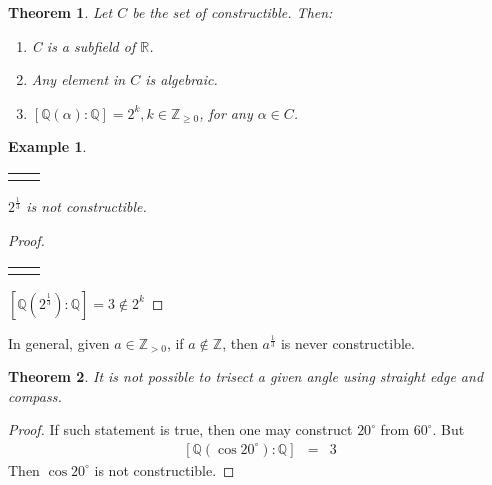 \documentclass{article}
\theoremstyle{MyNonumberplain}
\theoremstyle{break}
\newtheorem*{proof}{Proof. }
\newcommand{\nline}{\begin{tabular}{ll}&\\\end{tabular}}
\newcommand{\nin}{\not\in}
\theoremstyle{break}
\newtheorem{theorem}{Theorem}[section]
\newtheorem{example}{Example}[section]
\theoremstyle{break}
\theoremstyle{definition}
\theoremstyle{break}
\begin{document}
\begin{thmbox}
    \begin{theorem}
        Let $C$ be the set of constructible. Then:\bigskip

        \begin{enumerate}
            \item C is a subfield of $\mathbb{R}$.\bigskip
            \item Any element in $C$ is algebraic.\bigskip
            \item $[\mathbb{Q} (\alpha) : \mathbb{Q}] = 2^k, k \in \mathbb{Z}_{\geq 0}$, for
            any $\alpha \in C$.
        \end{enumerate}
    \end{theorem}
\end{thmbox}

\begin{expbox}
    \begin{example}
        \nline

        $2^{\frac{1}{3}}$ is not constructible.
    \end{example}
    \begin{prfbox}
        \begin{proof}

            \nline

            $\left[ \mathbb{Q} \left( 2^{\frac{1}{3}} \right) : \mathbb{Q} \right] = 3
            \nin 2^k$
        \end{proof}
    \end{prfbox}
    In general, given $a \in \mathbb{Z}_{> 0}$, if $a \nin \mathbb{Z}$, then
$a^{\frac{1}{3}}$ is never constructible.
\end{expbox}

\begin{thmbox}
    \begin{theorem}
        It is not possible to trisect a given angle using straight edge and compass.
    \end{theorem}
    \begin{prfbox}
        \begin{proof}
            If such statement is true, then one may construct $20^{\circ}$ from
            $60^{\circ}$. But
            \begin{eqnarray*}
              {}[\mathbb{Q} (\cos 20^{\circ}) : \mathbb{Q}] & = & 3
            \end{eqnarray*}
            Then $\cos 20^{\circ}$ is not constructible.
        \end{proof}
    \end{prfbox}
\end{thmbox}
\end{document}
